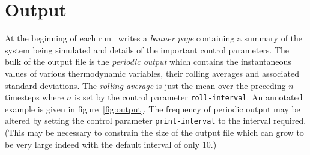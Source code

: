 \section{Output}
\label{sec:output}
At the beginning of each run \moldy\  writes a {\em banner page}
containing a summary of the system being simulated and details of the
important control parameters. The bulk of the output file is the {\em
periodic output} which contains the instantaneous values of various
thermodynamic variables, their rolling averages and associated
standard deviations. The {\em rolling average} is just the mean over
the preceding $n$ timesteps where $n$ is set by the control parameter
\verb'roll-interval'.   An annotated example is given in
figure~\ref{fig:output}.  The frequency of periodic output may be
altered by setting the control parameter \verb'print-interval' to the
interval required.  (This may be necessary to constrain the size of
the output file which can grow to be very large indeed with the
default interval of only 10.)  
